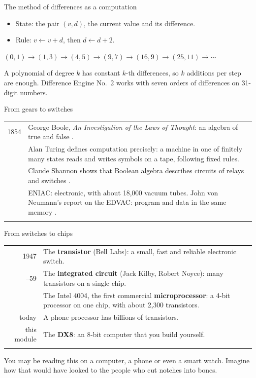 \documentclass[10pt]{wosm-slides}
\makeatletter
\newenvironment{timeline}
  {\par\smallskip
   \begin{tabular}{@{}>{\ttfamily\footnotesize\color{wosm-accent}}r
                   @{\hspace{0.9em}}>{\raggedright\arraybackslash}p{10.7cm}@{}}}
  {\end{tabular}\par}
\newcommand\when[2]{#1 & #2 \\ \addlinespace[0.35em]}
\makeatother
\begin{document}
\begin{frame}{The method of differences as a computation}
  \begin{itemize}
    \item State: the pair $(v, d)$, the current value and its difference.
    \item Rule: $v \leftarrow v + d$, then $d \leftarrow d + 2$.
  \end{itemize}

  \medskip
  \begin{center}
    $(0,1) \to (1,3) \to (4,5) \to (9,7) \to (16,9) \to (25,11) \to \cdots$
  \end{center}

  \medskip
  \begin{remark}
    A polynomial of degree $k$ has constant $k$-th differences, so $k$ additions
    per step are enough. Difference Engine No.~2 works with seven orders of
    differences on 31-digit numbers.
  \end{remark}
\end{frame}

\begin{frame}{From gears to switches}
  \begin{timeline}
    \when{1854}{George Boole, \emph{An Investigation of the Laws of Thought}: an
      algebra of true and false \unitref{3}.}
    \when{1936}{Alan Turing defines computation precisely: a machine in one of
      finitely many states reads and writes symbols on a tape, following fixed
      rules.}
    \when{1937}{Claude Shannon shows that Boolean algebra describes circuits of
      relays and switches \unitref{3--6}.}
    \when{1945}{ENIAC: electronic, with about 18,000 vacuum tubes. John von
      Neumann's report on the EDVAC: program and data in the same memory
      \unitref{15}.}
  \end{timeline}
\end{frame}

\begin{frame}{From switches to chips}
  \begin{timeline}
    \when{1947}{The \textbf{transistor} (Bell Labs): a small, fast and reliable
      electronic switch.}
    \when{1958--59}{The \textbf{integrated circuit} (Jack Kilby, Robert Noyce):
      many transistors on a single chip.}
    \when{1971}{The Intel 4004, the first commercial \textbf{microprocessor}: a
      4-bit processor on one chip, with about 2,300 transistors.}
    \when{today}{A phone processor has billions of transistors.}
    \when{this module}{The \textbf{DX8}: an 8-bit computer that you build yourself.}
  \end{timeline}

  \bigskip
  You may be reading this on a computer, a phone or even a smart watch. Imagine how
  that would have looked to the people who cut notches into bones.
\end{frame}
\end{document}
